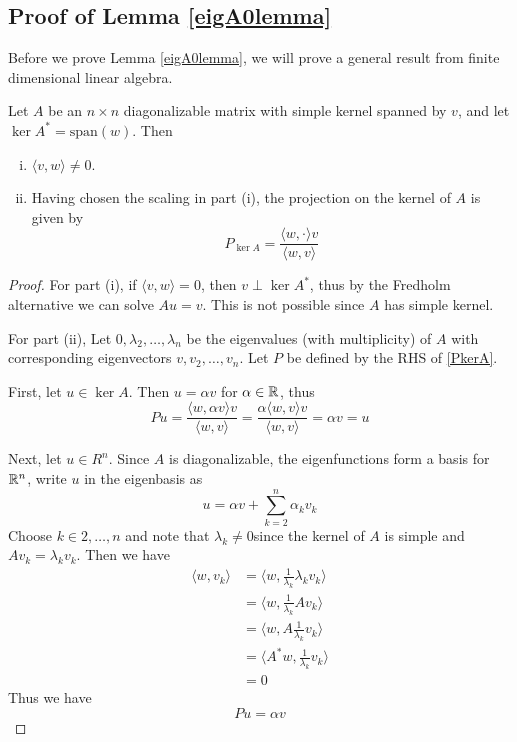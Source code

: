 \documentclass[thesis.tex]{subfiles}
\begin{document}
\subsection{Proof of Lemma \ref{eigA0lemma}}

Before we prove Lemma \ref{eigA0lemma}, we will prove a general result from finite dimensional linear algebra.

\begin{lemma}\label{kernelprojlemma}
Let $A$ be an $n \times n$ diagonalizable matrix with simple kernel spanned by $v$, and let $\ker A^* = \text{span}(w)$. Then 
\begin{enumerate}[(i)]
\item $\langle v, w \rangle \neq 0$.
\item Having chosen the scaling in part (i), the projection on the kernel of $A$ is given by
\begin{equation}\label{PkerA}
P_{\ker A} = \frac{ \langle w, \cdot \rangle v }{\langle w, v \rangle }
\end{equation}
\end{enumerate}
\begin{proof}
For part (i), if $\langle v, w \rangle = 0$, then $v \perp \ker A^*$, thus by the Fredholm alternative we can solve $A u = v$. This is not possible since $A$ has simple kernel.

For part (ii), Let $0, \lambda_2, \dots, \lambda_n$ be the eigenvalues (with multiplicity) of $A$ with corresponding eigenvectors $v, v_2, \dots, v_n$. Let $P$ be defined by the RHS of \eqref{PkerA}.

First, let $u \in \ker A$. Then $u = \alpha v$ for $\alpha \in \mathbb{R}$, thus 
\[
P u = \frac{ \langle w, \alpha v \rangle v }{\langle w, v \rangle } = \frac{ \alpha \langle w, v \rangle v}{\langle w, v \rangle } = \alpha v = u
\]

Next, let $u \in R^n$. Since $A$ is diagonalizable, the eigenfunctions form a basis for $\mathbb{R}^n$, write $u$ in the eigenbasis as
\[
u = \alpha v + \sum_{k=2}^n \alpha_k v_k
\]
Choose $k \in 2, \dots, n$ and note that $\lambda_k \neq 0$since the kernel of $A$ is simple and $A v_k = \lambda_k v_k$. Then we have
\begin{align*}
\langle w, v_k \rangle &= \langle w, \frac{1}{\lambda_k}\lambda_k v_k \rangle \\
&= \langle w, \frac{1}{\lambda_k} A v_k \rangle \\
&= \langle w, A \frac{1}{\lambda_k} v_k \rangle \\
&= \langle A^* w, \frac{1}{\lambda_k} v_k \rangle \\
&= 0
\end{align*}
Thus we have
\[
P u = \alpha v
\]
\end{proof}
\end{lemma}
\end{document}
